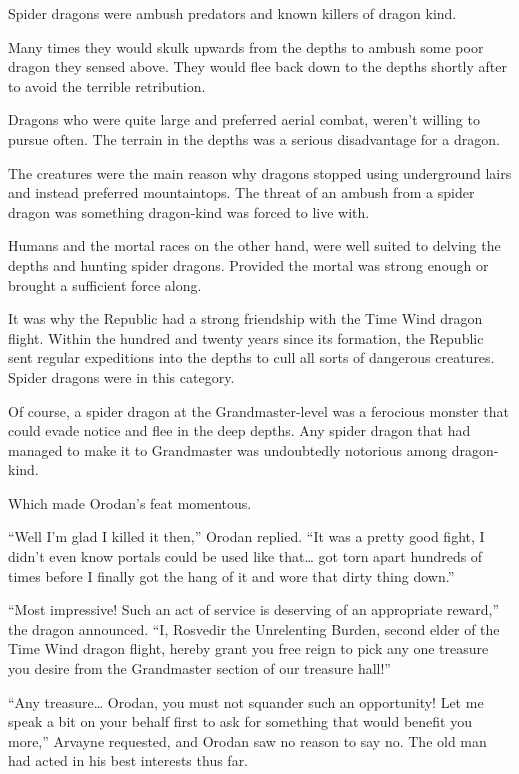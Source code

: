 \documentclass[a4paper,10pt]{book}
\begin{document}
Spider dragons were ambush predators and known killers of dragon kind.\par
Many times they would skulk upwards from the depths to ambush some poor dragon they sensed above. They would flee back down to the depths shortly after to avoid the terrible retribution.\par
Dragons who were quite large and preferred aerial combat, weren’t willing to pursue often. The terrain in the depths was a serious disadvantage for a dragon.\par
The creatures were the main reason why dragons stopped using underground lairs and instead preferred mountaintops. The threat of an ambush from a spider dragon was something dragon-kind was forced to live with.\par
Humans and the mortal races on the other hand, were well suited to delving the depths and hunting spider dragons. Provided the mortal was strong enough or brought a sufficient force along.\par
It was why the Republic had a strong friendship with the Time Wind dragon flight. Within the hundred and twenty years since its formation, the Republic sent regular expeditions into the depths to cull all sorts of dangerous creatures. Spider dragons were in this category.\par
Of course, a spider dragon at the Grandmaster-level was a ferocious monster that could evade notice and flee in the deep depths. Any spider dragon that had managed to make it to Grandmaster was undoubtedly notorious among dragon-kind.\par
Which made Orodan’s feat momentous.\par
“Well I’m glad I killed it then,” Orodan replied. “It was a pretty good fight, I didn’t even know portals could be used like that… got torn apart hundreds of times before I finally got the hang of it and wore that dirty thing down.”\par
“Most impressive! Such an act of service is deserving of an appropriate reward,” the dragon announced. “I, Rosvedir the Unrelenting Burden, second elder of the Time Wind dragon flight, hereby grant you free reign to pick any one treasure you desire from the Grandmaster section of our treasure hall!”\par
“Any treasure… Orodan, you must not squander such an opportunity! Let me speak a bit on your behalf first to ask for something that would benefit you more,” Arvayne requested, and Orodan saw no reason to say no. The old man had acted in his best interests thus far.\par
\end{document}
